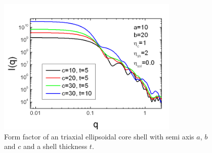 \begin{figure}[htb]
\begin{center}
\includegraphics[width=0.768\textwidth,height=0.588\textwidth]{../images/form_factor/Ellipsoid/triax_ellipsoidal_core_shell.png}
\end{center}
\caption{Form factor of an triaxial ellipsoidal core shell with semi
axis $a$, $b$ and $c$ and a shell thickness $t$.}
\label{fig:I_triax_ellipsoidal_core_shell}
\end{figure}
